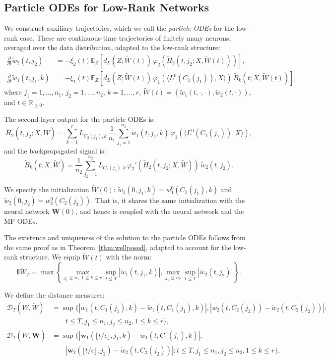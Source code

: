 \documentclass[nohyperref]{article}
\theoremstyle{plain}
\theoremstyle{definition}
\theoremstyle{remark}
\begin{document}
\subsection{Particle ODEs for Low-Rank Networks}

We construct auxiliary trajectories, which we call the \textit{particle ODEs} for the low-rank case. These are continuous-time trajectories of finitely many neurons, averaged over the data distribution, adapted to the low-rank structure:
\begin{align*}
\frac{\partial}{\partial t}\tilde{w}_2(t, j_2) &= -\xi_2(t)\mathbb{E}_Z\left[d_L(Z; \tilde{W}(t))\,\varphi_2(\tilde{H}_2(t, j_2; X, \tilde{W}(t)))\right],\\
\frac{\partial}{\partial t}\tilde{w}_1(t, j_1, k) &= -\xi_1(t)\mathbb{E}_Z\left[d_L(Z; \tilde{W}(t))\,\varphi_1(\langle L^0(C_1(j_1)), X\rangle)\,\tilde{B}_k(t; X, \tilde{W}(t))\right],
\end{align*}
where $j_1 = 1, \ldots, n_1$, $j_2 = 1, \ldots, n_2$, $k = 1, \ldots, r$, $\tilde{W}(t) = (\tilde{w}_1(t, \cdot, \cdot), \tilde{w}_2(t, \cdot))$, and $t \in \mathbb{R}_{\ge 0}$. 

The second-layer output for the particle ODEs is:
\[
\tilde{H}_2(t, j_2; X, \tilde{W}) = \sum_{k=1}^r L_{C_2(j_2),k}\,\frac{1}{n_1}\sum_{j_1=1}^{n_1} \tilde{w}_1(t, j_1, k)\,\varphi_1(\langle L^0(C_1(j_1)), X\rangle),
\]
and the backpropagated signal is:
\[
\tilde{B}_k(t; X, \tilde{W}) = \frac{1}{n_2}\sum_{j_2=1}^{n_2} L_{C_2(j_2),k}\,\varphi_2'(\tilde{H}_2(t, j_2; X, \tilde{W}))\,\tilde{w}_2(t, j_2).
\]

We specify the initialization $\tilde{W}(0)$: $\tilde{w}_1(0, j_1, k) = w_1^0(C_1(j_1), k)$ and $\tilde{w}_2(0, j_2) = w_2^0(C_2(j_2))$. That is, it shares the same initialization with the neural network $\mathbf{W}(0)$, and hence is coupled with the neural network and the MF ODEs.

The existence and uniqueness of the solution to the particle ODEs follows from the same proof as in Theorem~\ref{thm:wellposed}, adapted to account for the low-rank structure. We equip $\tilde{W}(t)$ with the norm:
\[
{\interleave{\tilde{W}}}_T = \max\left\{\max_{j_1 \le n_1, 1 \le k \le r}\sup_{t \le T}|\tilde{w}_1(t, j_1, k)|, \max_{j_2 \le n_2}\sup_{t \le T}|\tilde{w}_2(t, j_2)|\right\}.
\]

We define the distance measures:
\begin{align*}
\mathscr{D}_T(W, \tilde{W}) &= \sup\Big\{|w_1(t, C_1(j_1), k) - \tilde{w}_1(t, C_1(j_1), k)|, |w_2(t, C_2(j_2)) - \tilde{w}_2(t, C_2(j_2))|:\\
&\qquad t \le T, j_1 \le n_1, j_2 \le n_2, 1 \le k \le r\Big\},\\
\mathscr{D}_T(\tilde{W}, \mathbf{W}) &= \sup\Big\{|\mathbf{w}_1(\lfloor t/\epsilon\rfloor, j_1, k) - \tilde{w}_1(t, C_1(j_1), k)|,\\
&\qquad |\mathbf{w}_2(\lfloor t/\epsilon\rfloor, j_2) - \tilde{w}_2(t, C_2(j_2))|: t \le T, j_1 \le n_1, j_2 \le n_2, 1 \le k \le r\Big\}.
\end{align*}
\end{document}
